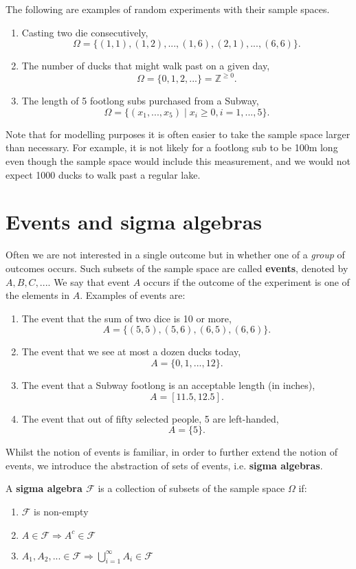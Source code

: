 The following are examples of random experiments with their sample spaces. 

\begin{enumerate}
    \item Casting two die consecutively, \[\Omega = \{(1,1),(1,2), ..., (1,6),(2,1),...,(6,6)\}.\]
    \item The number of ducks that might walk past on a given day, \[\Omega =\{0,1,2,...\} = \mathbb{Z}^{\geq 0}.\]
    \item The length of 5 footlong subs purchased from a Subway, \[\Omega = \{(x_1,...,x_5)\mid x_i\geq0, i=1,...,5\}.\]
\end{enumerate}

Note that for modelling purposes it is often easier to take the sample 
space larger than necessary. For example, it is not likely for a footlong 
sub to be 100m long even though the sample space would include this measurement, 
and we would not expect 1000 ducks to walk past a regular lake. 

\section{Events and sigma algebras}

Often we are not interested in a single outcome but in whether 
one of a \textit{group} of outcomes occurs. Such subsets 
of the sample space are called \textbf{events}, denoted by \(A, B, C, ...\). 
We say that event \(A\) occurs if the outcome of the experiment is one of the elements in \(A\). 
\medskip
Examples of events are:

\begin{enumerate}
    \item The event that the sum of two dice is 10 or more, \[A = \{(5,5),(5,6),(6,5),(6,6)\}.\]
    \item The event that we see at most a dozen ducks today, \[A = \{0, 1, ..., 12\}.\]
    \item The event that a Subway footlong is an acceptable length (in inches), \[A = [11.5,12.5].\]
    \item The event that out of fifty selected people, 5 are left-handed, \[A = \{5\}.\]
\end{enumerate}


Whilst the notion of events is familiar, in order to further extend 
the notion of events, we introduce the abstraction of sets of events, i.e. \textbf{sigma algebras}. 


\begin{definition}\label{defn:sigma algebra}
    A \textbf{sigma algebra \(\mathcal{F}\)} is a collection of 
    subsets of the sample space \(\Omega\) if:
    \begin{enumerate}
        \item \(\mathcal{F}\) is non-empty
        \item \(A\in\mathcal{F}\Rightarrow A^c\in\mathcal{F}\)
        \item \(A_1, A_2,...\in\mathcal{F}\Rightarrow \bigcup_{i=1}^\infty A_i\in\mathcal{F}\)
    \end{enumerate}
\end{definition}

